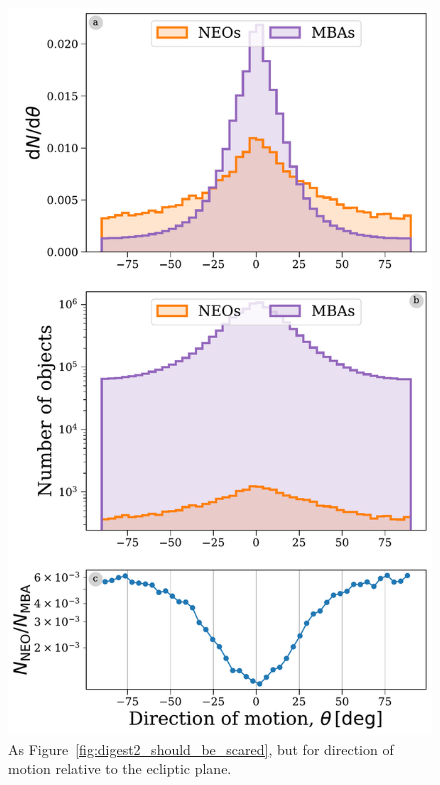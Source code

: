 \documentclass[twocolumn, twocolappendix]{aastex631}
\begin{document}
\begin{figure}[htb]
    \centering
    \includegraphics[width=\columnwidth]{figures/direction_dist_all.pdf}
    \caption{As Figure~\ref{fig:digest2_should_be_scared}, but for direction of motion relative to the ecliptic plane.}
    \label{fig:dir_all}
\end{figure}
\end{document}

